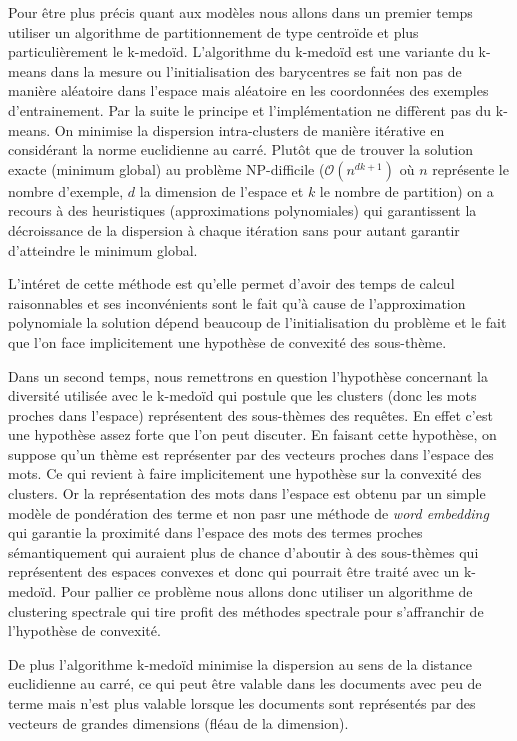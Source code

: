 \documentclass{article}
\begin{document}
Pour être plus précis quant aux modèles nous allons dans un premier temps utiliser un algorithme de partitionnement de type centroïde et plus particulièrement le k-medoïd. L'algorithme du k-medoïd est une variante du k-means dans la mesure ou l'initialisation des barycentres se fait non pas de manière aléatoire dans l'espace mais aléatoire en les coordonnées des exemples d'entrainement. Par la suite le principe et l'implémentation ne diffèrent pas du k-means. On minimise la dispersion intra-clusters de manière itérative en considérant la norme euclidienne au carré. Plutôt que de trouver la solution exacte (minimum global) au problème NP-difficile ($\mathcal{O}(n^{dk+1})$ où $n$ représente le nombre d'exemple, $d$ la dimension de l'espace et $k$ le nombre de partition) on a recours à des heuristiques (approximations polynomiales) qui garantissent la décroissance de la dispersion à chaque itération sans pour autant garantir d'atteindre le minimum global. 

L'intéret de cette méthode est qu'elle permet d'avoir des temps de calcul raisonnables et ses inconvénients sont le fait qu'à cause de l'approximation polynomiale la solution dépend beaucoup de l'initialisation du problème et le fait que l'on face implicitement une hypothèse de convexité des sous-thème. 

Dans un second temps, nous remettrons en question l'hypothèse concernant la diversité utilisée avec le k-medoïd qui postule que les clusters (donc les mots proches dans l'espace) représentent des sous-thèmes des requêtes. En effet c'est une hypothèse assez forte que l'on peut discuter. En faisant cette hypothèse, on suppose qu'un thème est représenter par des vecteurs proches dans l'espace des mots. Ce qui revient à faire implicitement une hypothèse sur la convexité des clusters. Or la représentation des mots dans l'espace est obtenu par un simple modèle de pondération des terme et non pasr une méthode de \textit{word embedding} qui garantie la proximité dans l'espace des mots des termes proches sémantiquement qui auraient plus de chance d'aboutir à des sous-thèmes qui représentent des espaces convexes et donc qui pourrait être traité avec un k-medoïd. Pour pallier ce problème nous allons donc utiliser un algorithme de clustering spectrale qui tire profit des méthodes spectrale pour s'affranchir de l'hypothèse de convexité.

De plus l'algorithme k-medoïd minimise la dispersion au sens de la distance euclidienne au carré, ce qui peut être valable dans les documents avec peu de terme mais n'est plus valable lorsque les documents sont représentés par des vecteurs de grandes dimensions (fléau de la dimension).
\end{document}
